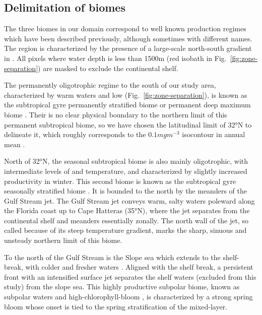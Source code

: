 \subsection{Delimitation of biomes}

The three biomes in our domain correspond to well known production regimes which have been described previously, although sometimes with different names.
The region is characterized by the presence of a large-scale north-south gradient in .
All pixels where water depth is less than 1500m (red isobath in Fig.~\ref{fig:zone-separation}) are masked to exclude the continental shelf.

The permanently oligotrophic regime to the south of our study area, characterized by warm waters and low  (Fig.~\ref{fig:zone-separation}), is known as the subtropical gyre permanently stratified biome \parencite{sarmiento_2004} or permanent deep  maximum biome \citep{bock_2022}.
Their is no clear physical boundary to the northern limit of this permanent subtropical biome, so we have chosen the latitudinal limit of 32°N to delineate it, which roughly corresponds to the \(0.1 mg m^{-3}\)  isocontour in annual mean .

North of 32°N, the seasonal subtropical biome is also mainly oligotrophic, with intermediate levels of  and temperature, and characterized by slightly increased productivity in winter.
This second biome is known as the subtropical gyre seasonally stratified biome \parencite{sarmiento_2004}.
It is bounded to the north by the meanders of the Gulf Stream jet.
The Gulf Stream jet conveys warm, salty waters poleward along the Florida coast up to Cape Hatteras (35°N), where the jet separates from the continental shelf and meanders essentially zonally.
The north wall of the jet, so called because of its steep temperature gradient, marks the sharp, sinuous and unsteady northern limit of this biome.

To the north of the Gulf Stream is the Slope sea which extends to the shelf-break, with colder and fresher waters \parencite{linder_1998}.
Aligned with the shelf break, a persistent front with an intensified surface jet separates the shelf waters (excluded from this study) from the slope sea.
This highly productive subpolar biome, known as subpolar waters \parencite{sarmiento_2004} and high-chlorophyll-bloom \citep{bock_2022}, is characterized by a strong spring bloom whose onset is tied to the spring stratification of the mixed-layer.

